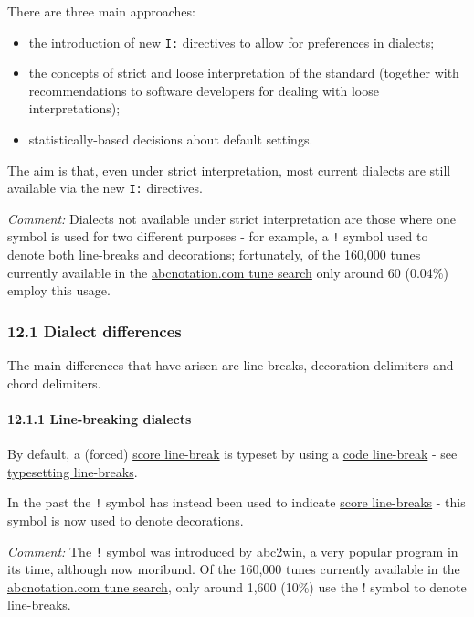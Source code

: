 \documentclass[oneside]{book}
\let\oldparagraph\paragraph
\renewcommand{\paragraph}[1]{\oldparagraph{#1}\mbox{}}
\begin{document}
There are three main approaches:

\begin{itemize}
\item
  the introduction of new \texttt{I:} directives to allow for
  preferences in dialects;
\item
  the concepts of strict and loose interpretation of the standard
  (together with recommendations to software developers for dealing with
  loose interpretations);
\item
  statistically-based decisions about default settings.
\end{itemize}

The aim is that, even under strict interpretation, most current dialects
are still available via the new \texttt{I:} directives.

\emph{Comment:} Dialects not available under strict interpretation are
those where one symbol is used for two different purposes - for example,
a \texttt{!} symbol used to denote both line-breaks and decorations;
fortunately, of the 160,000 tunes currently available in the
\href{http://abcnotation.com/search}{abcnotation.com tune search} only
around 60 (0.04\%) employ this usage.

\hypertarget{dialect_differences}{\subsubsection{12.1 Dialect
differences}\label{dialect_differences}}

The main differences that have arisen are line-breaks, decoration
delimiters and chord delimiters.

\hypertarget{line-breaking_dialects}{\paragraph{12.1.1 Line-breaking
dialects}\label{line-breaking_dialects}}

By default, a (forced)
\protect\hyperlink{score_line-break_definition}{score line-break} is
typeset by using a \protect\hyperlink{code_line-break_definition}{code
line-break} - see
\protect\hyperlink{typesetting_line-breaks}{typesetting line-breaks}.

In the past the \texttt{!} symbol has instead been used to indicate
\protect\hyperlink{score_line-break_definition}{score line-breaks} -
this symbol is now used to denote decorations.

\emph{Comment:} The \texttt{!} symbol was introduced by abc2win, a very
popular program in its time, although now moribund. Of the 160,000 tunes
currently available in the
\href{http://abcnotation.com/search}{abcnotation.com tune search}, only
around 1,600 (10\%) use the ! symbol to denote line-breaks.
\end{document}
